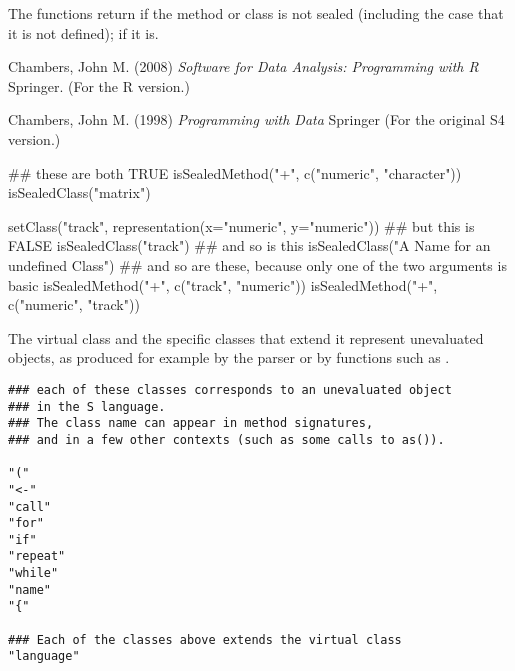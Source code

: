 %
\begin{Value}
The functions return  if the method or class is not
sealed (including the case that it is not defined);  if
it is.
\end{Value}
%
\begin{References}\relax
Chambers, John M. (2008)
\emph{Software for Data Analysis: Programming with R}
Springer.  (For the R version.)

Chambers, John M. (1998)
\emph{Programming with Data}
Springer (For the original S4 version.)
\end{References}
%
\begin{Examples}
\begin{ExampleCode}
## these are both TRUE
isSealedMethod("+", c("numeric", "character"))
isSealedClass("matrix")

setClass("track",
            representation(x="numeric", y="numeric"))
## but this is FALSE
isSealedClass("track")
## and so is this
isSealedClass("A Name for an undefined Class")
## and so are these, because only one of the two arguments is basic
isSealedMethod("+", c("track", "numeric"))
isSealedMethod("+", c("numeric", "track"))


\end{ExampleCode}
\end{Examples}
%
\begin{Description}\relax
  The virtual class  and the specific
classes that extend it represent unevaluated objects, as produced for
example by the parser or by functions such as .
\end{Description}
%
\begin{Usage}
\begin{verbatim}
### each of these classes corresponds to an unevaluated object
### in the S language.
### The class name can appear in method signatures,
### and in a few other contexts (such as some calls to as()).

"("
"<-"
"call"
"for"
"if"
"repeat"
"while"
"name"
"{"

### Each of the classes above extends the virtual class
"language"
\end{verbatim}
\end{Usage}
